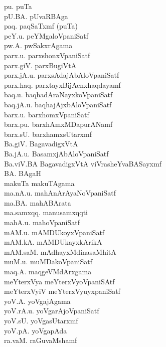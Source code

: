 {\begin{multicols}{2}
\begin{tabbing}
pu. \> puTa\\[2pt]
pU.BA. \> pUvaRBAga\\[2pt]
paq. \> paqSaTxmf (puTa)\\[2pt]
peY.u. \> peYMgaloVpaniSatf\\[2pt]
pw.A. \> pwSakxrAgama\\[2pt]
parx.u. \> parxshonxVpaniSatf\\[2pt]
parx.giV. \> parxBugiVtA\\[2pt]
parx.jA.u. \> parxsAdajAbAloVpaniSatf\\[2pt]
parx.haq. \> parxtayxBijAcnxhaqdayamf\\[2pt]
baq.u. \> baqhadAraNayxkoVpaniSatf\\[2pt]
baq.jA.u. \> baqhajAjxbAloVpaniSatf\\[2pt]
barx.u. \> barxhomxVpaniSatf\\[2pt]
barx.pu. \> barxhAmxMDapurANamf\\[2pt]
barx.sU. \> barxhamxsUtarxmf\\[2pt]
Ba.giV. \> BagavadigxVtA\\[2pt]
Ba.jA.u. \> BasamxjAbAloVpaniSatf\\[2pt]
Ba.viV.BA \> BagavadigxVtA viVrasheYvaBASayxmf\\[2pt]
BA. \> BAgaH\\[2pt]
makuTa \> makuTAgama\\[2pt]
ma.nA.u. \> mahAnArAyaNoVpaniSatf\\[2pt]
ma.BA. \> mahABArata\\[2pt]
ma.samxqq. \> manusamxqqti\\[2pt]
mahA.u. \> mahoVpaniSatf\\[2pt]
mAM.u. \> mAMDUkoyxVpaniSatf\\[2pt]
mAM.kA. \> mAMDUkayxkArikA\\[2pt]
mAM.saM. \> mAdhayxMdinasaMhitA\\[2pt]
muM.u. \> muMDakoVpaniSatf\\[2pt]
maq.A. \> maqgeVMdArxgama\\[2pt]
meYterxVya \> meYterxVyoVpaniSAtf\\[2pt]
meYterxVyiV \> meYterxVyuyxpaniSatf\\[2pt]
yoV.A. \> yoVgajAgama\\[2pt]
yoV.rA.u. \> yoVgarAjoVpaniSatf\\[2pt]
yoV.sU. \> yoVgasUtarxmf\\[2pt]
yoV.pA. \> yoVgapAda\\[2pt]
ra.vaM. \> raGuvaMshamf\\[2pt]

\end{tabbing}
\end{multicols}}
